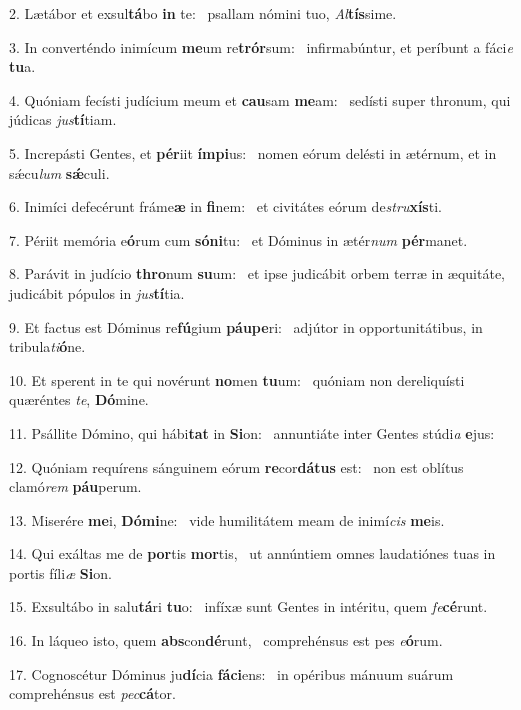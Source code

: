 2. Lætábor et exsul\textbf{tá}bo \textbf{in} te: \ast\  psallam nómini tuo, \textit{Al}\textbf{tís}sime.\

3. In converténdo inimícum \textbf{me}um re\textbf{trór}sum: \ast\  infirmabúntur, et períbunt a fáci\textit{e} \textbf{tu}a.\

4. Quóniam fecísti judícium meum et \textbf{cau}sam \textbf{me}am: \ast\  sedísti super thronum, qui júdicas \textit{jus}\textbf{tí}tiam.\

5. Increpásti Gentes, et \textbf{pér}iit \textbf{ím}\textbf{pi}us: \ast\  nomen eórum delésti in ætérnum, et in sǽcu\textit{lum} \textbf{sǽ}culi.\

6. Inimíci defecérunt fráme\textbf{æ} in \textbf{fi}nem: \ast\  et civitátes eórum de\textit{stru}\textbf{xís}ti.\

7. Périit memória e\textbf{ó}rum cum \textbf{só}\textbf{ni}tu: \ast\  et Dóminus in ætér\textit{num} \textbf{pér}manet.\

8. Parávit in judício \textbf{thro}num \textbf{su}um: \ast\  et ipse judicábit orbem terræ in æquitáte, judicábit pópulos in \textit{jus}\textbf{tí}tia.\

9. Et factus est Dóminus re\textbf{fú}gium \textbf{páu}\textbf{pe}ri: \ast\  adjútor in opportunitátibus, in tribula\textit{ti}\textbf{ó}ne.\

10. Et sperent in te qui novérunt \textbf{no}men \textbf{tu}um: \ast\  quóniam non dereliquísti quæréntes \textit{te}, \textbf{Dó}mine.\

11. Psállite Dómino, qui hábi\textbf{tat} in \textbf{Si}on: \ast\  annuntiáte inter Gentes stúdi\textit{a} \textbf{e}jus:\

12. Quóniam requírens sánguinem eórum \textbf{re}cor\textbf{dá}\textbf{tus} est: \ast\  non est oblítus clamó\textit{rem} \textbf{páu}perum.\

13. Miserére \textbf{me}i, \textbf{Dó}\textbf{mi}ne: \ast\  vide humilitátem meam de inimí\textit{cis} \textbf{me}is.\

14. Qui exáltas me de \textbf{por}tis \textbf{mor}tis, \ast\  ut annúntiem omnes laudatiónes tuas in portis fíli\textit{æ} \textbf{Si}on.\

15. Exsultábo in salu\textbf{tá}ri \textbf{tu}o: \ast\  infíxæ sunt Gentes in intéritu, quem \textit{fe}\textbf{cé}runt.\

16. In láqueo isto, quem \textbf{abs}con\textbf{dé}runt, \ast\  comprehénsus est pes \textit{e}\textbf{ó}rum.\

17. Cognoscétur Dóminus ju\textbf{dí}cia \textbf{fá}\textbf{ci}ens: \ast\  in opéribus mánuum suárum comprehénsus est \textit{pec}\textbf{cá}tor.\

